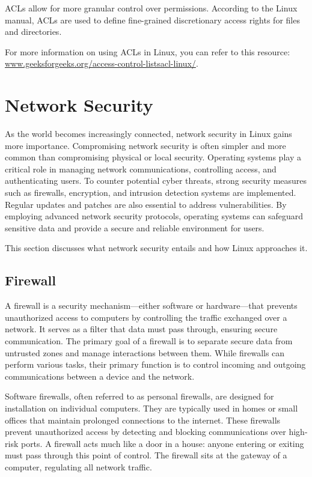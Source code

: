 \documentclass[conference]{IEEEtran}
\begin{document}
ACLs allow for more granular control over permissions. According to the Linux manual, ACLs are used to define fine-grained discretionary access rights for files and directories.

For more information on using ACLs in Linux, you can refer to this resource: 
\url{www.geeksforgeeks.org/access-control-listsacl-linux/}.

\section{Network Security}

As the world becomes increasingly connected, network security in Linux gains more importance. Compromising network security is often simpler and more common than compromising physical or local security. Operating systems play a critical role in managing network communications, controlling access, and authenticating users. To counter potential cyber threats, strong security measures such as firewalls, encryption, and intrusion detection systems are implemented. Regular updates and patches are also essential to address vulnerabilities. By employing advanced network security protocols, operating systems can safeguard sensitive data and provide a secure and reliable environment for users.

This section discusses what network security entails and how Linux approaches it.

\subsection{Firewall}

A firewall is a security mechanism—either software or hardware—that prevents unauthorized access to computers by controlling the traffic exchanged over a network. It serves as a filter that data must pass through, ensuring secure communication. The primary goal of a firewall is to separate secure data from untrusted zones and manage interactions between them. While firewalls can perform various tasks, their primary function is to control incoming and outgoing communications between a device and the network.

Software firewalls, often referred to as personal firewalls, are designed for installation on individual computers. They are typically used in homes or small offices that maintain prolonged connections to the internet. These firewalls prevent unauthorized access by detecting and blocking communications over high-risk ports. A firewall acts much like a door in a house: anyone entering or exiting must pass through this point of control. The firewall sits at the gateway of a computer, regulating all network traffic.
\end{document}
